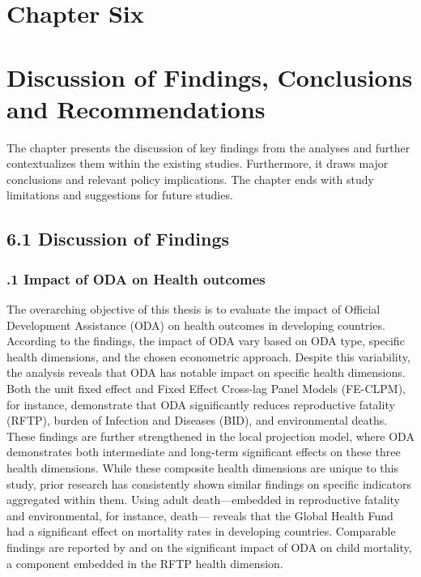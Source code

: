 \section*{\centering Chapter Six}
\section*{\centering Discussion of Findings, Conclusions and Recommendations}
The chapter presents the discussion of key findings from the analyses and further contextualizes them within the existing studies. Furthermore, it draws major conclusions and relevant policy implications. The chapter ends with study limitations and suggestions for future studies. 
\subsection*{6.1 Discussion of Findings}
\subsubsection*{.1 Impact of ODA on Health outcomes}
The overarching objective of this thesis is to evaluate the impact of Official Development Assistance (ODA) on health outcomes in developing countries. According to the findings, the impact of ODA vary based on ODA type, specific health dimensions, and the chosen econometric approach. Despite this variability, the analysis reveals that ODA has notable impact on specific health dimensions. Both the unit fixed effect and Fixed Effect Cross-lag Panel  Models (FE-CLPM), for instance, demonstrate that ODA significantly reduces reproductive fatality (RFTP), burden of Infection and Diseases (BID), and environmental deaths. These findings are further strengthened in the local projection model, where ODA demonstrates both intermediate and long-term significant effects on these three health dimensions. 
While these composite health dimensions are unique to this study, prior research has consistently shown similar findings on specific indicators aggregated within them. Using adult death—embedded in reproductive fatality and environmental, for instance, death—\textcite{yan_mortality_2015} reveals that the Global Health Fund had a significant effect on mortality rates in developing countries. Comparable findings are reported by \textcite{doucouliagos_health_2021} and \textcite{kavanagh_governance_2019} on the significant impact of ODA on child mortality, a component embedded in the RFTP health dimension.

